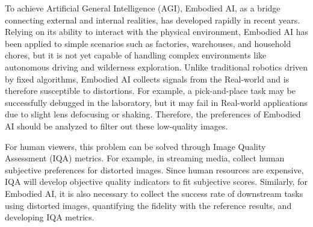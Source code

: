 \documentclass{article}
\begin{document}
To achieve Artificial General Intelligence (AGI), Embodied AI, as a bridge connecting external and internal realities, has developed rapidly in recent years. Relying on its ability to interact with the physical environment, Embodied AI \cite{review:embodied1,review:embodied2,review:embodied3} has been applied to simple scenarios such as factories, warehouses, and household chores, but it is not yet capable of handling complex environments like autonomous driving and wilderness exploration. Unlike traditional robotics driven by fixed algorithms, Embodied AI collects signals from the Real-world and is therefore susceptible to distortions. For example, a pick-and-place task may be successfully debugged in the laboratory, but it may fail in Real-world applications due to slight lens defocusing or shaking. Therefore, the preferences of Embodied AI should be analyzed to filter out these low-quality images.

For human viewers, this problem can be solved through Image Quality Assessment (IQA) metrics. For example, in streaming media, collect human subjective preferences for distorted images. Since human resources are expensive, IQA will develop objective quality indicators to fit subjective scores. Similarly, for Embodied AI, it is also necessary to collect the success rate of downstream tasks using distorted images, quantifying the fidelity with the reference results, and developing IQA metrics.
\end{document}
